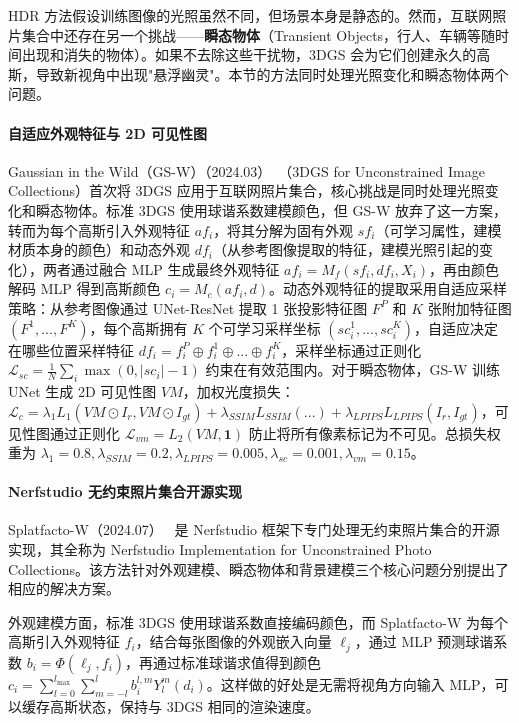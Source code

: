 HDR 方法假设训练图像的光照虽然不同，但场景本身是静态的。然而，互联网照片集合中还存在另一个挑战——\textbf{瞬态物体}（Transient Objects，行人、车辆等随时间出现和消失的物体）。如果不去除这些干扰物，3DGS 会为它们创建永久的高斯，导致新视角中出现"悬浮幽灵"。本节的方法同时处理光照变化和瞬态物体两个问题。

\paragraph{自适应外观特征与 2D 可见性图}

Gaussian in the Wild（GS-W）（2024.03）~\cite{2403_15704}（3DGS for Unconstrained Image Collections）首次将 3DGS 应用于互联网照片集合，核心挑战是同时处理光照变化和瞬态物体。标准 3DGS 使用球谐系数建模颜色，但 GS-W 放弃了这一方案，转而为每个高斯引入外观特征 $af_i$，将其分解为固有外观 $sf_i$（可学习属性，建模材质本身的颜色）和动态外观 $df_i$（从参考图像提取的特征，建模光照引起的变化），两者通过融合 MLP 生成最终外观特征 $af_i = M_f(sf_i, df_i, X_i)$，再由颜色解码 MLP 得到高斯颜色 $c_i = M_c(af_i, d)$。动态外观特征的提取采用自适应采样策略：从参考图像通过 UNet-ResNet 提取 1 张投影特征图 $F^P$ 和 $K$ 张附加特征图 $(F^1, ..., F^K)$，每个高斯拥有 $K$ 个可学习采样坐标 $(sc_i^1, ..., sc_i^K)$，自适应决定在哪些位置采样特征 $df_i = f_i^P \oplus f_i^1 \oplus ... \oplus f_i^K$，采样坐标通过正则化 $\mathcal{L}_{sc} = \frac{1}{N}\sum_i \max(0, |sc_i| - 1)$ 约束在有效范围内。对于瞬态物体，GS-W 训练 UNet 生成 2D 可见性图 $VM$，加权光度损失：$\mathcal{L}_c = \lambda_1 L_1(VM \odot I_r, VM \odot I_{gt}) + \lambda_{SSIM} L_{SSIM}(...) + \lambda_{LPIPS} L_{LPIPS}(I_r, I_{gt})$，可见性图通过正则化 $\mathcal{L}_{vm} = L_2(VM, \mathbf{1})$ 防止将所有像素标记为不可见。总损失权重为 $\lambda_1=0.8, \lambda_{SSIM}=0.2, \lambda_{LPIPS}=0.005, \lambda_{sc}=0.001, \lambda_{vm}=0.15$。

\paragraph{Nerfstudio 无约束照片集合开源实现}

Splatfacto-W（2024.07）~\cite{2407_12306} 是 Nerfstudio 框架下专门处理无约束照片集合的开源实现，其全称为 Nerfstudio Implementation for Unconstrained Photo Collections。该方法针对外观建模、瞬态物体和背景建模三个核心问题分别提出了相应的解决方案。

外观建模方面，标准 3DGS 使用球谐系数直接编码颜色，而 Splatfacto-W 为每个高斯引入外观特征 $f_i$，结合每张图像的外观嵌入向量 $\ell_j$，通过 MLP 预测球谐系数 $b_i = \Phi(\ell_j, f_i)$，再通过标准球谐求值得到颜色 $c_i = \sum_{l=0}^{l_{\max}} \sum_{m=-l}^{l} b_i^{l,m} Y_l^m(d_i)$。这样做的好处是无需将视角方向输入 MLP，可以缓存高斯状态，保持与 3DGS 相同的渲染速度。

